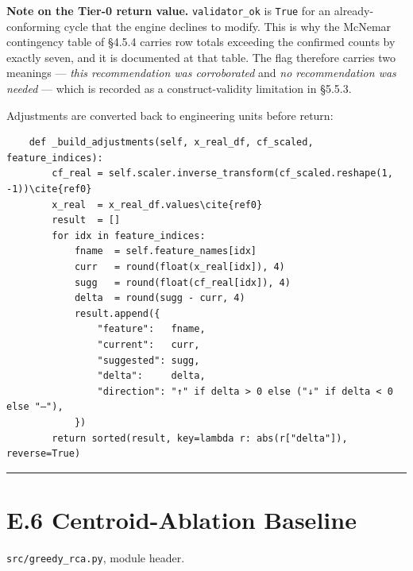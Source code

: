 \textbf{Note on the Tier-0 return value.} \texttt{validator\_ok} is \texttt{True} for an already-conforming cycle that the engine declines to modify. This is why the McNemar contingency table of §4.5.4 carries row totals exceeding the confirmed counts by exactly seven, and it is documented at that table. The flag therefore carries two meanings --- \emph{this recommendation was corroborated} and \emph{no recommendation was needed} --- which is recorded as a construct-validity limitation in §5.5.3.

Adjustments are converted back to engineering units before return:

\begin{verbatim}
    def _build_adjustments(self, x_real_df, cf_scaled, feature_indices):
        cf_real = self.scaler.inverse_transform(cf_scaled.reshape(1, -1))\cite{ref0}
        x_real  = x_real_df.values\cite{ref0}
        result  = []
        for idx in feature_indices:
            fname  = self.feature_names[idx]
            curr   = round(float(x_real[idx]), 4)
            sugg   = round(float(cf_real[idx]), 4)
            delta  = round(sugg - curr, 4)
            result.append({
                "feature":   fname,
                "current":   curr,
                "suggested": sugg,
                "delta":     delta,
                "direction": "↑" if delta > 0 else ("↓" if delta < 0 else "—"),
            })
        return sorted(result, key=lambda r: abs(r["delta"]), reverse=True)
\end{verbatim}

\begin{center}\rule{0.5\linewidth}{0.5pt}\end{center}

\hypertarget{e.6-centroid-ablation-baseline}{%
\section{E.6 Centroid-Ablation Baseline}\label{e.6-centroid-ablation-baseline}}

\texttt{src/greedy\_rca.py}, module header.

